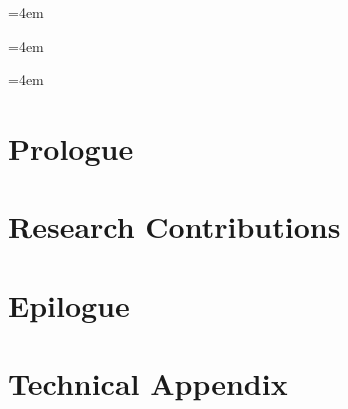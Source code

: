 \documentclass[11pt,oneside,openright]{book}
\begin{document}
\frontmatter





% 



\cleardoublepage
{\begin{tocwide}\emergencystretch=4em\tableofcontents\end{tocwide}}
\cleardoublepage
{\begin{tocwide}\emergencystretch=4em\listoffigures\end{tocwide}}
\cleardoublepage
{\begin{tocwide}\emergencystretch=4em\listoftables\end{tocwide}}

\mainmatter

\part{Prologue}


\part{Research Contributions}






\part{Epilogue}


\appendix
\part{Technical Appendix}


\backmatter
\printbibliography[heading=bibintoc,title={References}]
\end{document}
